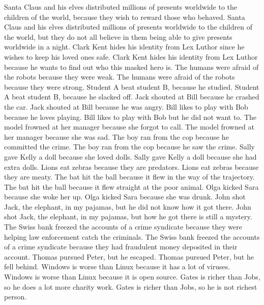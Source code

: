 \documentclass{article}
\begin{document}
\begin{enumerate}
Santa Claus and his elves distributed millions of presents worldwide to the children of the world, because they wish to reward those who behaved.
Santa Claus and his elves distributed millions of presents worldwide to the children of the world, but they do not all believe in them being able to give presents worldwide in a night.
Clark Kent hides his identity from Lex Luthor since he wishes to keep his loved ones safe.
Clark Kent hides his identity from Lex Luthor because he wants to find out who this masked hero is.
The humans were afraid of the robots because they were weak.
The humans were afraid of the robots because they were strong.
Student A beat student B, because he studied.
Student A beat student B, because he slacked off.
Jack shouted at Bill because he crashed the car.
Jack shouted at Bill because he was angry.
Bill likes to play with Bob because he loves playing.
Bill likes to play with Bob but he did not want to.
The model frowned at her manager because she forgot to call.
The model frowned at her manager because she was sad.
The boy ran from the cop because he committed the crime.
The boy ran from the cop because he saw the crime.
Sally gave Kelly a doll because she loved dolls.
Sally gave Kelly a doll because she had extra dolls.
Lions eat zebras because they are predators.
Lions eat zebras because they are meaty.
The bat hit the ball because it flew in the way of the trajectory.
The bat hit the ball because it flew straight at the poor animal.
Olga kicked Sara because she woke her up.
Olga kicked Sara because she was drunk.
John shot Jack, the elephant, in my pajamas, but he did not know how it got there.
John shot Jack, the elephant, in my pajamas, but how he got there is still a mystery.
The Swiss bank freezed the accounts of a crime syndicate because they were helping law enforcement catch the criminals.
The Swiss bank freezed the accounts of a crime syndicate because they had fraudulent money deposited in their account.
Thomas pursued Peter, but he escaped.
Thomas pursued Peter, but he fell behind.
Windows is worse than Linux because it has a lot of viruses.
Windows is worse than Linux because it is open source.
Gates is richer than Jobs, so he does a lot more charity work.
Gates is richer than Jobs, so he is not richest person.
\end{enumerate}
\end{document}
